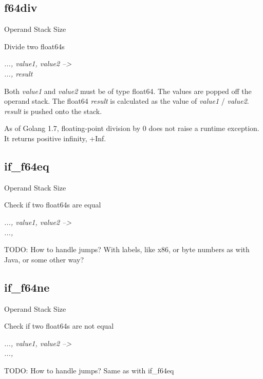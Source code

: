 \documentclass[12pt]{article}
\begin{document}
		\subsection*{f64div}
			\begin{labeling}{Operand Stack Size}
				\item [\textbf{Operation}] Divide two float64s
				\item [\textbf{Format}] 
				\item [\textbf{Operand Stack}] \textit{..., value1, value2 --\textgreater} \\
										\textit{..., result}
				\item [\textbf{Description}] Both \textit{value1} and \textit{value2} must be of type float64. The values are popped off the operand stack. The float64 \textit{result} is calculated as the value of \textit{value1} / \textit{value2}. \textit{result} is pushed onto the stack. \\ 
				\item [\textbf{Notes}] As of Golang 1.7, floating-point division by 0 does not raise a runtime exception. It returns positive infinity, +Inf.
			\end{labeling}	
		\newpage
		
		\subsection*{if\_f64eq}
			\begin{labeling}{Operand Stack Size}
				\item [\textbf{Operation}] Check if two float64s are equal 
				\item [\textbf{Format}] 
				\item [\textbf{Operand Stack}] \textit{..., value1, value2 --\textgreater} \\
										\textit{..., }
				\item [\textbf{Description}] TODO: How to handle jumps? With labels, like x86, or byte numbers as with Java, or some other way? 
			\end{labeling}	
		\newpage
		
		\subsection*{if\_f64ne}
			\begin{labeling}{Operand Stack Size}
				\item [\textbf{Operation}] Check if two float64s are not equal 
				\item [\textbf{Format}] 
				\item [\textbf{Operand Stack}] \textit{..., value1, value2 --\textgreater} \\
										\textit{..., }
				\item [\textbf{Description}] TODO: How to handle jumps? Same as with if\_f64eq
			\end{labeling}	
		\newpage
		
\end{document}
